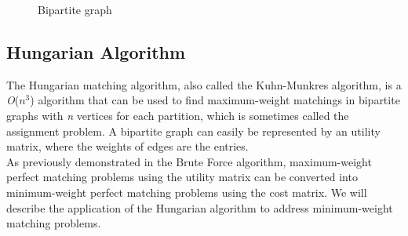 \begin{figure}[H]
  \centering
  \begin{subfigure}{0.48\linewidth}
    \centering
    \caption{}
    \label{fig:match_1}
  \end{subfigure}
  \hspace{0.02\linewidth}
  \begin{subfigure}{0.48\linewidth}
    \centering
    \caption{}
    \label{fig:match_2}
  \end{subfigure}
  \caption{Bipartite graph}
\end{figure}

\subsection{Hungarian Algorithm}

The Hungarian matching algorithm, also called the Kuhn-Munkres algorithm, is a \textit{O}($\textit{n}^3$) algorithm that can be used to find maximum-weight matchings in bipartite graphs with \textit{n} vertices for each partition, which is sometimes called the assignment problem.
A bipartite graph can easily be represented by an utility matrix, where the weights of edges are the entries. \\
As previously demonstrated in the Brute Force algorithm, maximum-weight perfect matching problems using the utility matrix can be converted into minimum-weight perfect matching problems using the cost matrix. 
We will describe the application of the Hungarian algorithm to address minimum-weight matching problems.
\\

